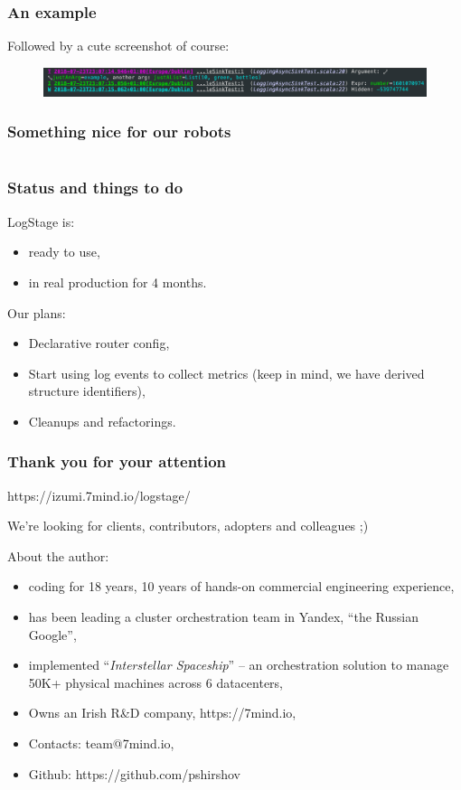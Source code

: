 \documentclass[usenames,dvipsnames]{beamer}
\begin{document}
\begin{frame}
\frametitle{An example}
Followed by a cute screenshot of course:
\begin{figure}
    \includegraphics[width=\textwidth]{media/logstage-console.png}
\end{figure}
\end{frame}

\begin{frame}
\frametitle{Something nice for our robots}
\begin{figure}
    \inputminted[fontsize=\scriptsize]{json}{target/ex-json-out.tmp}
\end{figure}
\end{frame}

\begin{frame}
\frametitle{Status and things to do}
LogStage is:
\begin{itemize}
\item ready to use,
\item in real production for 4 months.
\end{itemize}
\vspace{0.3cm}
Our plans:
\begin{itemize}
\item Declarative router config,
\item Start using log events to collect metrics (keep in mind, we have derived structure identifiers),
\item Cleanups and refactorings.
\end{itemize}
\end{frame}

\begin{frame}
    \frametitle{Thank you for your attention}

    \begin{center}
      https://izumi.7mind.io/logstage/

      We're looking for clients, contributors, adopters and colleagues ;)
    \end{center}

    About the author:
    \begin{itemize}
        \item coding for 18 years, 10 years of hands-on commercial engineering experience,
        \item has been leading a cluster orchestration team in Yandex, ``the Russian Google'',
        \item implemented ``\textit{Interstellar Spaceship}'' -- an orchestration solution to manage 50K+ physical machines across 6 datacenters,
        \item Owns an Irish R\&D company, https://7mind.io,
        \item Contacts: team@7mind.io,
        \item Github: https://github.com/pshirshov
    \end{itemize}
\end{frame}
\end{document}
